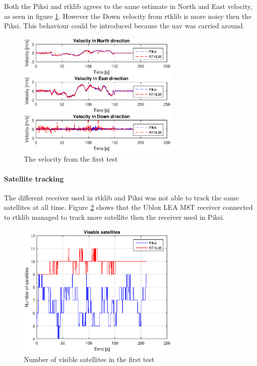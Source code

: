 Both the Piksi and \gls{rtklib} agrees to the same estimate in North and East velocity, as seen in figure \ref{figure:VelocityWalk1}. However the Down velocity from \gls{rtklib} is more noisy then the Piksi. This behaviour could be introduced because the \gls{uav} was carried around.
\begin{figure}[H]
	\centering
		\includegraphics[width=0.7\textwidth]{figs/plots/velocityWalk1.eps}
		\caption{The velocity from the first test}
		\label{figure:VelocityWalk1}
\end{figure}
\paragraph{Satellite tracking}

The different receiver used in \gls{rtklib} and Piksi was not able to track the same satellites at all time. Figure \ref{figure:NumSatWalk1} shows that the Ublox LEA M8T receiver connected to \gls{rtklib} managed to track more satellite then the receiver used in Piksi. 
\begin{figure}[H]
	\centering
		\includegraphics[width=0.7\textwidth]{figs/plots/numSatWalk1.eps}
		\caption{Number of visible satellites in the first test}
		\label{figure:NumSatWalk1}
\end{figure}
